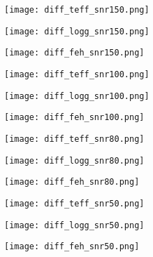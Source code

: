 \documentclass[fleqn,usenatbib]{mnras}
\begin{document}
\begin{figure*}%
 \centering
 \begin{minipage}{0.33\textwidth}
  \texttt{[image: diff\_teff\_snr150.png]} 
 \end{minipage}
 \begin{minipage}{0.33\textwidth}
  \texttt{[image: diff\_logg\_snr150.png]} 
 \end{minipage}
 \begin{minipage}{0.33\textwidth}
  \texttt{[image: diff\_feh\_snr150.png]} 
 \end{minipage}
 \centering
 \begin{minipage}{0.33\textwidth}
  \texttt{[image: diff\_teff\_snr100.png]} 
 \end{minipage}
 \begin{minipage}{0.33\textwidth}
  \texttt{[image: diff\_logg\_snr100.png]} 
 \end{minipage}
 \begin{minipage}{0.33\textwidth}
  \texttt{[image: diff\_feh\_snr100.png]} 
 \end{minipage}
 \centering
 \begin{minipage}{0.33\textwidth}
  \texttt{[image: diff\_teff\_snr80.png]} 
 \end{minipage}
 \begin{minipage}{0.33\textwidth}
  \texttt{[image: diff\_logg\_snr80.png]} 
 \end{minipage}
 \begin{minipage}{0.33\textwidth}
  \texttt{[image: diff\_feh\_snr80.png]} 
 \end{minipage}
 \centering
 \begin{minipage}{0.33\textwidth}
  \texttt{[image: diff\_teff\_snr50.png]} 
 \end{minipage}
 \begin{minipage}{0.33\textwidth}
  \texttt{[image: diff\_logg\_snr50.png]} 
 \end{minipage}
 \begin{minipage}{0.33\textwidth}
  \texttt{[image: diff\_feh\_snr50.png]} 
 \end{minipage}
\end{figure*}
\end{document}
